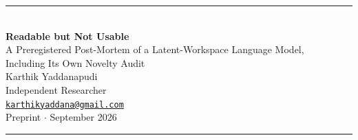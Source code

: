 \documentclass[10pt,a4paper]{article}
\newcommand{\papertitle}{Readable but Not Usable}
\newcommand{\papersubtitle}{A Preregistered Post-Mortem of a Latent-Workspace Language Model,\\[0.15em] Including Its Own Novelty Audit}
\begin{document}
\begin{center}
{\color{navy}\rule{\textwidth}{1.2pt}}\\[1.3em]
{\huge\bfseries \papertitle}\\[0.55em]
{\LARGE\color{accent} \papersubtitle}\\[1.2em]
{\large Karthik Yaddanapudi}\\[0.25em]
{\normalsize Independent Researcher\\[0.1em]
\href{mailto:karthikyaddana@gmail.com}{\texttt{karthikyaddana@gmail.com}}}\\[0.8em]
{\normalsize Preprint \;\;$\cdot$\; September 2026}\\[1.2em]
{\color{navy}\rule{\textwidth}{1.2pt}}
\end{center}
\vspace{0.8em}
\end{document}
